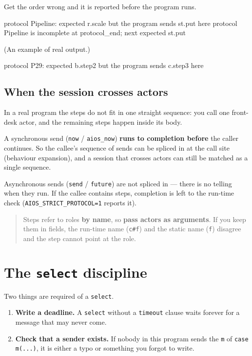 \documentclass[11pt,a4paper]{article}
\begin{document}
Get the order wrong and it is reported before the program runs.

\begin{term}
protocol Pipeline: expected r.scale but the program sends st.put here
protocol Pipeline is incomplete at protocol_end; next expected st.put
\end{term}

(An example of real output.)

\begin{term}
protocol P29: expected b.step2 but the program sends c.step3 here
\end{term}

\subsection{When the session crosses actors}

In a real program the steps do not fit in one straight sequence: you call one
front-desk actor, and the remaining steps happen inside its body.

A synchronous send (\texttt{now} / \texttt{aios\_now}) \textbf{runs to
completion before} the caller continues. So the callee's sequence of sends can
be spliced in at the call site (behaviour expansion), and a session that
crosses actors can still be matched as a single sequence.

Asynchronous sends (\texttt{send} / \texttt{future}) are not spliced in ---
there is no telling when they run. If the callee contains steps, completion is
left to the run-time check (\texttt{AIOS\_STRICT\_PROTOCOL=1} reports it).

\begin{quote}\small
Steps refer to roles \textbf{by name}, so \textbf{pass actors as arguments}.
If you keep them in fields, the run-time name (\texttt{c\#f}) and the static
name (\texttt{f}) disagree and the step cannot point at the role.
\end{quote}

\section{The \texttt{select} discipline}
\label{sec:selectrule}

Two things are required of a \texttt{select}.

\begin{enumerate}
\item \textbf{Write a deadline.} A \texttt{select} without a \texttt{timeout}
  clause waits forever for a message that may never come.
\item \textbf{Check that a sender exists.} If nobody in this program sends the
  \texttt{m} of \texttt{case m(...)}, it is either a typo or something you
  forgot to write.
\end{enumerate}
\end{document}
